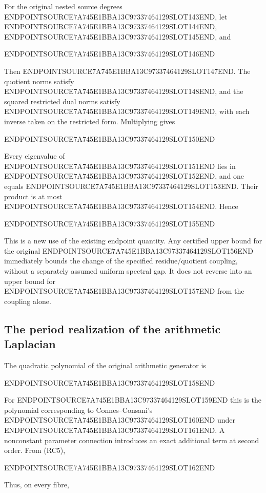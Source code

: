 For the original nested source degrees ENDPOINTSOURCE7A745E1BBA13C97337464129SLOT143END, let ENDPOINTSOURCE7A745E1BBA13C97337464129SLOT144END, ENDPOINTSOURCE7A745E1BBA13C97337464129SLOT145END, and

ENDPOINTSOURCE7A745E1BBA13C97337464129SLOT146END

Then ENDPOINTSOURCE7A745E1BBA13C97337464129SLOT147END. The quotient norms satisfy ENDPOINTSOURCE7A745E1BBA13C97337464129SLOT148END, and the squared restricted dual norms satisfy ENDPOINTSOURCE7A745E1BBA13C97337464129SLOT149END, with each inverse taken on the restricted form. Multiplying gives

ENDPOINTSOURCE7A745E1BBA13C97337464129SLOT150END

Every eigenvalue of ENDPOINTSOURCE7A745E1BBA13C97337464129SLOT151END lies in ENDPOINTSOURCE7A745E1BBA13C97337464129SLOT152END, and one equals ENDPOINTSOURCE7A745E1BBA13C97337464129SLOT153END. Their product is at most ENDPOINTSOURCE7A745E1BBA13C97337464129SLOT154END. Hence

ENDPOINTSOURCE7A745E1BBA13C97337464129SLOT155END

This is a new use of the existing endpoint quantity. Any certified upper bound for the original ENDPOINTSOURCE7A745E1BBA13C97337464129SLOT156END immediately bounds the change of the specified residue/quotient coupling, without a separately assumed uniform spectral gap. It does not reverse into an upper bound for ENDPOINTSOURCE7A745E1BBA13C97337464129SLOT157END from the coupling alone.

\subsection{The period realization of the arithmetic Laplacian}\label{endpoint-residue_original--the-period-realization-of-the-arithmetic-laplacian}

The quadratic polynomial of the original arithmetic generator is

ENDPOINTSOURCE7A745E1BBA13C97337464129SLOT158END

For ENDPOINTSOURCE7A745E1BBA13C97337464129SLOT159END this is the polynomial corresponding to Connes--Consani's ENDPOINTSOURCE7A745E1BBA13C97337464129SLOT160END under ENDPOINTSOURCE7A745E1BBA13C97337464129SLOT161END. A nonconstant parameter connection introduces an exact additional term at second order. From (RC5),

ENDPOINTSOURCE7A745E1BBA13C97337464129SLOT162END

Thus, on every fibre,

